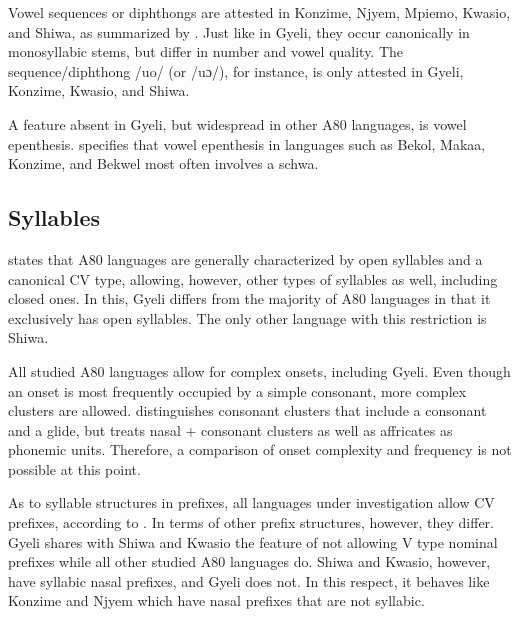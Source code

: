 Vowel sequences or diphthongs are attested in Konzime, Njyem, Mpiemo, Kwasio, and Shiwa, as summarized by \citet[330]{cheucle2014}. Just like in Gyeli, they occur canonically in monosyllabic stems, but differ in  number and vowel quality. The sequence/diphthong /uo/ (or /uɔ/), for instance, is only attested in Gyeli, Konzime, Kwasio, and Shiwa.

A feature
absent in Gyeli, but widespread in other A80 languages, is vowel epenthesis. \citet[332]{cheucle2014} specifies that vowel epenthesis in languages such as Bekol, Makaa, Konzime, and Bekwel most often involves a schwa.

\subsection{Syllables} \citet[319]{cheucle2014} states that A80 languages are generally characterized by open syllables and a canonical CV type, allowing, however,  other types of syllables as well, including closed ones. In this, Gyeli differs from the majority of A80 languages in that it exclusively has open syllables. The only other language with this restriction is Shiwa.

All studied A80 languages allow for complex onsets, including Gyeli. Even though an onset is most frequently occupied by a simple consonant, more complex clusters are allowed. \citet[319]{cheucle2014} distinguishes consonant clusters that include a consonant and a glide, but treats nasal + consonant clusters as well as affricates as phonemic units. Therefore, a comparison of onset complexity and frequency is not possible at this point.

As to syllable structures in prefixes, all languages under investigation allow CV prefixes, according to \citet[322]{cheucle2014}. In terms of other prefix structures, however, they differ. Gyeli shares with Shiwa and Kwasio the feature of not allowing V type nominal prefixes while all other studied A80 languages do. Shiwa and Kwasio, however, have syllabic nasal prefixes, and Gyeli does not. In this respect, it behaves like Konzime and Njyem which have nasal prefixes that are not syllabic.

